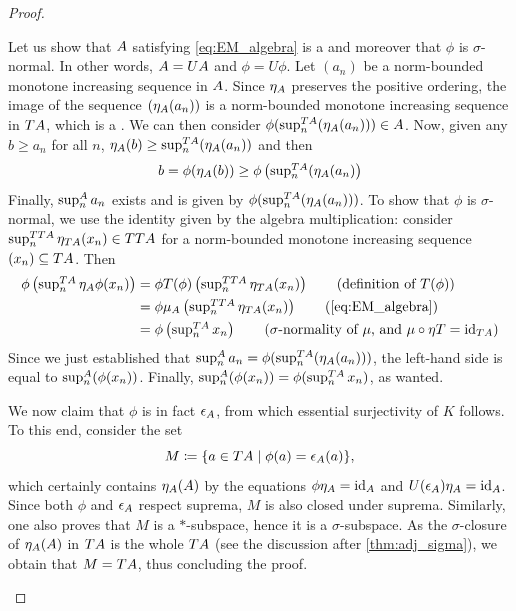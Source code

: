 \begin{proof}
\begin{description}
		      Let us show that ${A}$ satisfying \eqref{eq:EM_algebra} is a \cstars{} and moreover that $\phi$ is $\sigma$-normal.
		      In other words, ${A} = U{A}$ and $\phi=U\phi$.
		      Let $(a_n)$ be a norm-bounded monotone increasing sequence in ${A}$.
		      Since $\eta_{{A}}$ preserves the positive ordering, the image of the sequence $(\eta_{{A}}(a_n))$ is a norm-bounded monotone increasing sequence in $T{A}$, which is a \cstars{}.
		      We can then consider $\phi(\sup_n^{T{A}}(\eta_{{A}}(a_n)))\in {A}$.
		      Now, given any $b\ge a_n$ for all $n$, $\eta_{{A}}(b) \ge \sup_n^{T{A}}(\eta_{{A}} (a_n))$ and then
		      \[
			      b=\phi(\eta_{{A}}(b)) \ge \textstyle\phi\left(\sup_n^{T{A}}(\eta_{{A}}(a_n)\right)
		      \]
		      Finally, $\sup_n^{{A}} a_n $ exists and is given by $\phi (\sup_n^{T{A}}(\eta_{{A}} (a_n)))$.
		      To show that $\phi$ is $\sigma$-normal, we use the identity given by the algebra multiplication: consider $\sup^{TT{A}}_n \eta_{T{A}} (x_n)\in TT{A}$ for a norm-bounded monotone increasing sequence $(x_n)\subseteq T{A}$.
		      Then
			      \begin{align}
				      \textstyle\phi\left(\sup_n^{T\A} \eta_{\A} \phi(x_n)\right) & = \textstyle\phi T(\phi) \left(\sup_n^{TT\A} \eta_{T\A} (x_n)\right)  \tag{definition of $T(\phi)$}\\
				                                                        & = \textstyle\phi \mu_{\A} \left(\sup_n^{TT\A}\eta_{T\A} (x_n)\right) \tag{\ref{eq:EM_algebra}}\\
				                                                        & = \textstyle\phi \left(\sup_n^{T\A} x_n\right)                       \tag{$\sigma$-normality of $\mu$, and $\mu \circ \eta T =\id_{T\A}$}
			      \end{align}
		      Since we just established that $\sup_n^{{A}} a_n = \phi (\sup_n^{T{A}} (\eta_{{A}}(a_n)))$, the left-hand side is equal to $\sup^{{A}}_n (\phi(x_n))$.
		      Finally, $\sup^{{A}}_n (\phi(x_n)) = \phi(\sup^{T{A}}_n x_n)$, as wanted.

		      We now claim that $\phi$ is in fact $\epsilon_{{A}}$, from which essential surjectivity of $K$ follows.
		      To this end, consider the set
		      \[M\coloneqq \lbrace a\in T{A} \mid \phi(a)=\epsilon_{{A}}(a)\rbrace, \]which certainly contains $\eta_{{A}} ({A})$ by the equations $\phi \eta_{{A}}=\operatorname{id}_{{A}}$ and $U(\epsilon_{{A}}) \eta_{{A}}=\operatorname{id}_{{A}}$.
		      Since both $\phi$ and $\epsilon_{{A}}$ respect suprema, $M$ is also closed under suprema.
		      Similarly, one also proves that $M$ is a $*$-subspace, hence it is a $\sigma$-subspace.
		      As the $\sigma$-closure of $\eta_{{A}} ({A})$ in $T{A}$ is the whole $T{A}$ (see the discussion after \cref{thm:adj_sigma}), we obtain that $M=T{A}$, thus concluding the proof.\qedhere
	\end{description}
\end{proof}


